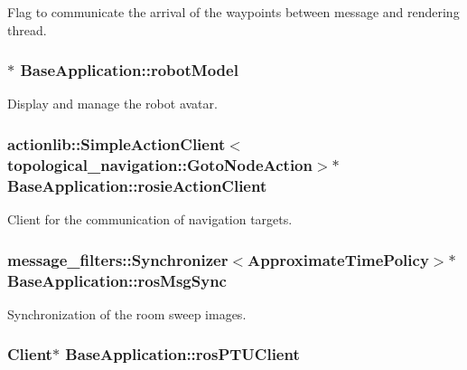 \-Flag to communicate the arrival of the waypoints between message and rendering thread. \hypertarget{classBaseApplication_a884bd9efccf3e8ab710ac74a1a819e69}{
\subsubsection[{robot\-Model}]{$\ast$ {\bf \-Base\-Application\-::robot\-Model}}}\label{classBaseApplication_a884bd9efccf3e8ab710ac74a1a819e69}
\-Display and manage the robot avatar. \hypertarget{classBaseApplication_a48fdcb84193361574ad803e3e9529b9f}{
\subsubsection[{rosie\-Action\-Client}]{\setlength{\rightskip}{0pt plus 5cm}actionlib\-::\-Simple\-Action\-Client$<$topological\-\_\-navigation\-::\-Goto\-Node\-Action$>$$\ast$ {\bf \-Base\-Application\-::rosie\-Action\-Client}}}\label{classBaseApplication_a48fdcb84193361574ad803e3e9529b9f}
\-Client for the communication of navigation targets. \hypertarget{classBaseApplication_a61075324a878878f31706cd03eac163e}{
\subsubsection[{ros\-Msg\-Sync}]{\setlength{\rightskip}{0pt plus 5cm}message\-\_\-filters\-::\-Synchronizer$<$\-Approximate\-Time\-Policy$>$$\ast$ {\bf \-Base\-Application\-::ros\-Msg\-Sync}}}\label{classBaseApplication_a61075324a878878f31706cd03eac163e}
\-Synchronization of the room sweep images. \hypertarget{classBaseApplication_a2a8d2bd4faf3c20800191f8dd0525983}{
\subsubsection[{ros\-P\-T\-U\-Client}]{\setlength{\rightskip}{0pt plus 5cm}\-Client$\ast$ {\bf \-Base\-Application\-::ros\-P\-T\-U\-Client}}}\label{classBaseApplication_a2a8d2bd4faf3c20800191f8dd0525983}

